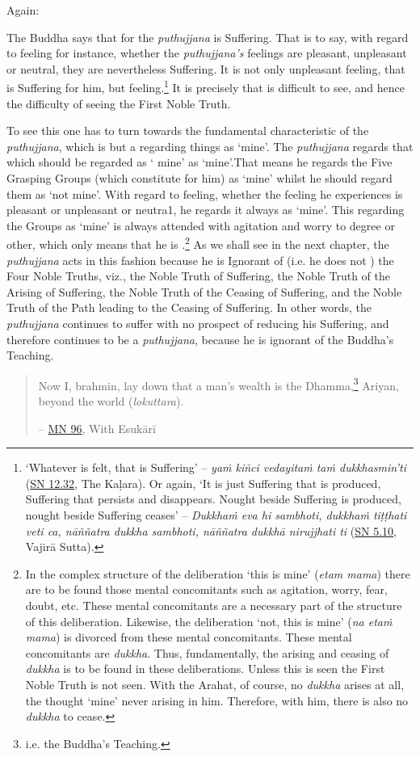 Again:

The Buddha says that for the \emph{puthujjana}  is Suffering. That is to say, with regard to feeling for instance, whether the \emph{puthujjana's} feelings are pleasant, unpleasant or neutral, they are nevertheless Suffering. It is not only unpleasant feeling, that is Suffering for him, but  feeling.\footnote{`Whatever is felt, that is Suffering' -- \emph{yaṁ kiñci vedayitaṁ taṁ dukkhasmin'ti} (\href{https://suttacentral.net/sn12.32/en/bodhi}{SN 12.32}, The Kaḷara). Or again, `It is just Suffering that is produced, Suffering that persists and disappears. Nought beside Suffering is produced, nought beside Suffering ceases' -- \emph{Dukkhaṁ eva hi sambhoti, dukkhaṁ tiṭṭhati veti ca, nāññatra dukkha sambhoti, nāññatra dukkhā nirujjhati ti} (\href{https://suttacentral.net/sn5.10/en/bodhi}{SN 5.10}, Vajirā Sutta).} It is precisely  that is difficult to see, and hence the difficulty of seeing the First Noble Truth.

To see this one has to turn towards the fundamental characteristic of the \emph{puthujjana}, which is but a regarding things as `mine'. The \emph{puthujjana} regards that which should be regarded as ` mine' as `mine'.That means he regards the Five Grasping Groups (which constitute  for him) as `mine' whilst he should regard them as `not mine'. With regard to feeling, whether the feeling he experiences is pleasant or unpleasant or neutra1, he regards it always as `mine'. This regarding the Groups as `mine' is always attended with agitation and worry to  degree or other, which only means that he is .\footnote{In the complex structure of the deliberation `this is mine' (\emph{etam mama}) there are to be found those mental concomitants such as agitation, worry, fear, doubt, etc. These mental concomitants are a necessary part of the structure of this deliberation. Likewise, the deliberation `not, this is mine' (\emph{na etaṁ mama}) is divorced from these mental concomitants. These mental concomitants are \emph{dukkha}. Thus, fundamentally, the arising and ceasing of \emph{dukkha} is to be found in these deliberations. Unless this is seen the First Noble Truth is not seen. With the Arahat, of course, no \emph{dukkha} arises at all, the thought `mine' never arising in him. Therefore, with him, there is also no \emph{dukkha} to cease.} As we shall see in the next chapter, the \emph{puthujjana} acts in this fashion because he is Ignorant of (i.e. he does not ) the Four Noble Truths, viz., the Noble Truth of Suffering, the Noble Truth of the Arising of Suffering, the Noble Truth of the Ceasing of Suffering, and the Noble Truth of the Path leading to the Ceasing of Suffering. In other words, the \emph{puthujjana} continues to suffer with no prospect of reducing his Suffering, and therefore continues to be a \emph{puthujjana}, because he is ignorant of the Buddha's Teaching.

\begin{quote}
Now I, brahmin, lay down that a man's wealth is the Dhamma,\footnote{i.e. the Buddha's Teaching.} Ariyan, beyond the world (\emph{lokuttara}).

 -- \href{https://suttacentral.net/mn96/en/sujato}{MN 96}, With Esukārī
\end{quote}
